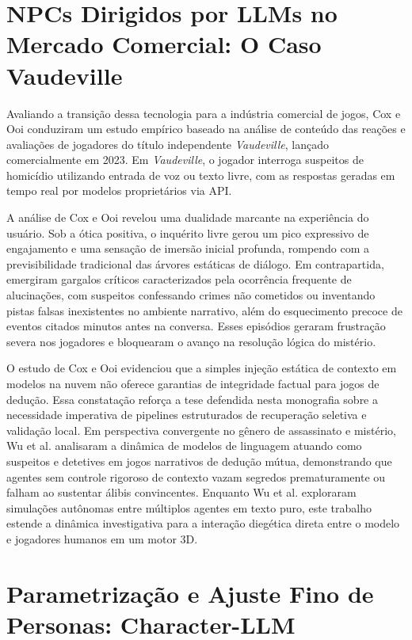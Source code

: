 \section{NPCs Dirigidos por LLMs no Mercado Comercial: O Caso Vaudeville}
\label{sec:rel_cox}

Avaliando a transição dessa tecnologia para a indústria comercial de jogos, Cox e Ooi \cite{cox2023conversational} conduziram um estudo empírico baseado na análise de conteúdo das reações e avaliações de jogadores do título independente \textit{Vaudeville}, lançado comercialmente em 2023. Em \textit{Vaudeville}, o jogador interroga suspeitos de homicídio utilizando entrada de voz ou texto livre, com as respostas geradas em tempo real por modelos proprietários via API.

A análise de Cox e Ooi \cite{cox2023conversational} revelou uma dualidade marcante na experiência do usuário. Sob a ótica positiva, o inquérito livre gerou um pico expressivo de engajamento e uma sensação de imersão inicial profunda, rompendo com a previsibilidade tradicional das árvores estáticas de diálogo. Em contrapartida, emergiram gargalos críticos caracterizados pela ocorrência frequente de alucinações, com suspeitos confessando crimes não cometidos ou inventando pistas falsas inexistentes no ambiente narrativo, além do esquecimento precoce de eventos citados minutos antes na conversa. Esses episódios geraram frustração severa nos jogadores e bloquearam o avanço na resolução lógica do mistério.

O estudo de Cox e Ooi evidenciou que a simples injeção estática de contexto em modelos na nuvem não oferece garantias de integridade factual para jogos de dedução. Essa constatação reforça a tese defendida nesta monografia sobre a necessidade imperativa de pipelines estruturados de recuperação seletiva e validação local. Em perspectiva convergente no gênero de assassinato e mistério, Wu et al. \cite{wu2024deciphering} analisaram a dinâmica de modelos de linguagem atuando como suspeitos e detetives em jogos narrativos de dedução mútua, demonstrando que agentes sem controle rigoroso de contexto vazam segredos prematuramente ou falham ao sustentar álibis convincentes. Enquanto Wu et al. exploraram simulações autônomas entre múltiplos agentes em texto puro, este trabalho estende a dinâmica investigativa para a interação diegética direta entre o modelo e jogadores humanos em um motor 3D.

\section{Parametrização e Ajuste Fino de Personas: Character-LLM}
\label{sec:rel_shao}

